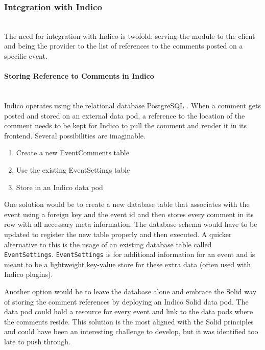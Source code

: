 \subsubsection{Integration with Indico}\mbox{}\\

The need for integration with Indico is twofold: serving the module to the client and being the provider to the list of references to the comments posted on a specific event.
\vspace{0.5cm}
\paragraph{Storing Reference to Comments in Indico}\mbox{}\\

Indico operates using the relational database PostgreSQL \cite{postgresql}. When a comment gets posted and stored on an external data pod, a reference to the location of the comment needs to be kept for Indico to pull the comment and render it in its frontend. Several possibilities are imaginable. 

\begin{enumerate}
    \item Create a new EventComments table
    \item Use the existing EventSettings table
    \item Store in an Indico data pod 
\end{enumerate}

One solution would be to create a new database table that associates with the event using a foreign key and the event id and then stores every comment in its row with all necessary meta information. The database schema would have to be updated to register the new table properly and then executed. A quicker alternative to this is the usage of an existing database table called \texttt{EventSettings}. \texttt{EventSettings} is for additional information for an event and is meant to be a lightweight key-value store for these extra data (often used with Indico plugins).

Another option would be to leave the database alone and embrace the Solid way of storing the comment references by deploying an Indico Solid data pod. The data pod could hold a resource for every event and link to the data pods where the comments reside. This solution is the most aligned with the Solid principles and could have been an interesting challenge to develop, but it was identified too late to push through.
\vspace{0.5cm}
